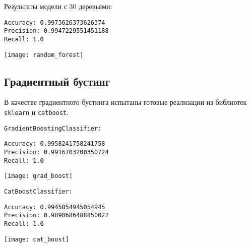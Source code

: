 Результаты модели с 30 деревьями:

\begin{lstlisting}[frame=none, numbers=none]
Accuracy: 0.9973626373626374
Precision: 0.9947229551451188
Recall: 1.0
\end{lstlisting}
\begin{center}
\texttt{[image: random\_forest]}
\end{center}

\subsection*{Градиентный бустинг}

В качестве градиентного бустинга испытаны готовые реализации из библиотек \texttt{sklearn} и \texttt{catboost}.

\texttt{GradientBoostingClassifier:}
\begin{lstlisting}[frame=none, numbers=none]
Accuracy: 0.9958241758241758
Precision: 0.9916703200350724
Recall: 1.0
\end{lstlisting}
\begin{center}
\texttt{[image: grad\_boost]}
\end{center}

\texttt{CatBoostClassifier:}
\begin{lstlisting}[frame=none, numbers=none]
Accuracy: 0.9945054945054945
Precision: 0.9890686488850022
Recall: 1.0
\end{lstlisting}
\begin{center}
\texttt{[image: cat\_boost]}
\end{center}

\pagebreak
